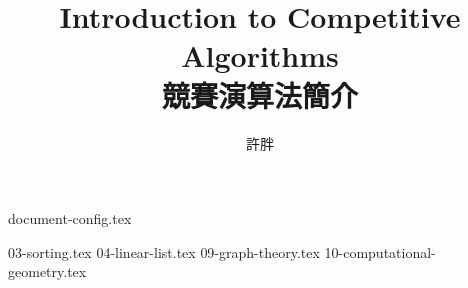\documentclass[12pt,a4paper,oneside]{book}
\begin{document}
\begin{CJK}{UTF8}{bkai}

{document-config.tex}
\title{Introduction to Competitive Algorithms\\競賽演算法簡介}
\author{許胖}
\maketitle
\tableofcontents

{03-sorting.tex}
{04-linear-list.tex}
{09-graph-theory.tex}
{10-computational-geometry.tex}

\printindex[noun]

\listoffigures
\clearpage
\end{CJK}
\end{document}
